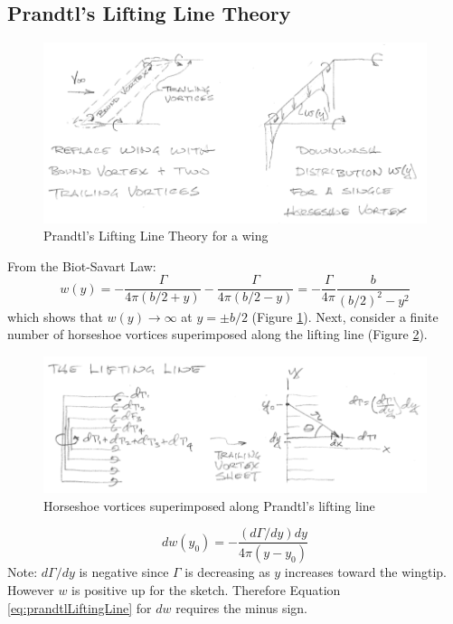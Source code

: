 \documentclass[draft=false, titlepage]{article}
\begin{document}
\subsection{Prandtl's Lifting Line Theory}
\begin{figure}[ht]
    \centering
    \includegraphics[width=0.8\linewidth]{Figures/prandtlLiftingLineP105.PNG}
    \caption{Prandtl's Lifting Line Theory for a wing}
    \label{fig:prandtlLiftingLineP105}
\end{figure}
From the Biot-Savart Law:
\begin{equation*}
w(y) = -\frac{\Gamma}{4\pi (b/2 + y)} - \frac{\Gamma}{4\pi(b/2-y)} = -\frac{\Gamma}{4\pi}\frac{b}{(b/2)^2-y^2}
\end{equation*}
which shows that $w(y) \rightarrow \infty$ at $y=\pm b/2$ (Figure \ref{fig:prandtlLiftingLineP105}). Next, consider a finite number of horseshoe vortices superimposed along the lifting line (Figure \ref{fig:prandtlLiftingLine2P105}).
\begin{figure}[ht]
    \centering
    \includegraphics[width=0.8\linewidth]{Figures/prandtlLiftingLine2P105.PNG}
    \caption{Horseshoe vortices superimposed along Prandtl's lifting line}
    \label{fig:prandtlLiftingLine2P105}
\end{figure}
\begin{equation}
dw(y_0) = -\frac{(d\Gamma/dy)dy}{4\pi (y-y_0)}
    \label{eq:prandtlLiftingLine}
\end{equation}
Note: $d\Gamma/dy$ is negative since $\Gamma$ is decreasing as $y$ increases toward the wingtip. However $w$ is positive up for the sketch. Therefore Equation \ref{eq:prandtlLiftingLine} for $dw$ requires the minus sign.
\end{document}

